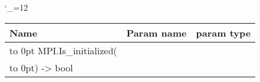\begingroup \catcode`\_=12 \tt
\begin{tabular}{lll}
\toprule
\textrm{Name}&\textrm{Param name}&\textrm{param type}\\
\midrule
\hbox to 0pt {MPI.Is_initialized(\hss}\\
\hbox to 0pt{) -> bool\hss}\\
\bottomrule
\end{tabular}
\endgroup
